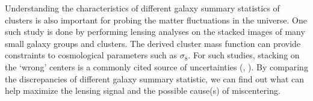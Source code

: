 Understanding the characteristics of different galaxy
summary statistics of clusters is also important for  
probing the matter fluctuations in the universe. 
One such study is done by performing lensing analyses on the stacked images of 
many small galaxy groups and clusters. 
The derived cluster mass function can provide constraints to cosmological
parameters such as $\sigma_8$. 
For such studies, stacking on the `wrong' centers is a commonly cited
source of uncertainties (\citealt{Johnston2007b},
\citealt{Ford2014}). By comparing the discrepancies of different galaxy
summary statistic, we can find out what can help maximize the lensing signal and 
the possible cause(s) of miscentering. 

 

